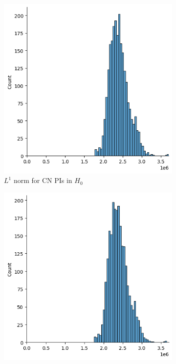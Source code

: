 \documentclass{article}
\begin{document}
\begin{figure}
  \centering
  \begin{subfigure}{0.32\textwidth}
    \includegraphics[width=\textwidth]{figures/PIs/displot_median_pi_CN_H_0.png}
    \caption{$L^1$ norm for CN PIs in $H_0$}
  \end{subfigure}
  \begin{subfigure}{0.32\textwidth}
    \includegraphics[width=\textwidth]{figures/PIs/displot_median_pi_MCI_H_0.png}

\end{subfigure}
\end{figure}
\end{document}
